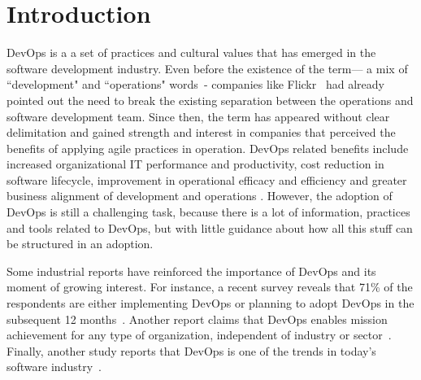 \section{Introduction} \label{sec:introduction}

DevOps is a a set of practices and cultural values that has emerged in the
software development industry. Even before
the existence of the term--- a mix of ``development" and ``operations"
words~\cite{httermann2012devops}- companies like Flickr~\cite{flickr}
had already pointed out the need to break the existing separation between
the operations and software development team. Since then, the term
has appeared without clear delimitation and gained strength and interest
in companies that perceived the benefits of applying agile practices in
operation. DevOps related benefits include increased organizational IT
performance and productivity, cost reduction in software lifecycle, improvement
in operational efficacy and efficiency and greater business alignment of
development and operations \cite{characterizing_devops_sbes_2016}.
However, the adoption of DevOps is still a challenging task, because there is a
lot of information, practices and tools related to DevOps, but with little
guidance about how all this stuff can be structured in an adoption.


Some industrial reports have reinforced the importance of DevOps and its moment
of growing interest. For instance, a recent survey reveals
that 71\% of the respondents are either implementing DevOps or
planning to adopt DevOps in the subsequent 12 months~\cite{state_of_agile}.
Another report claims that DevOps enables mission achievement
for any type of organization, independent of industry or sector~\cite{state_of_devops}.
Finally, another study reports that DevOps is one of the trends in
today's software industry~\cite{stackoverflow_2018}.

